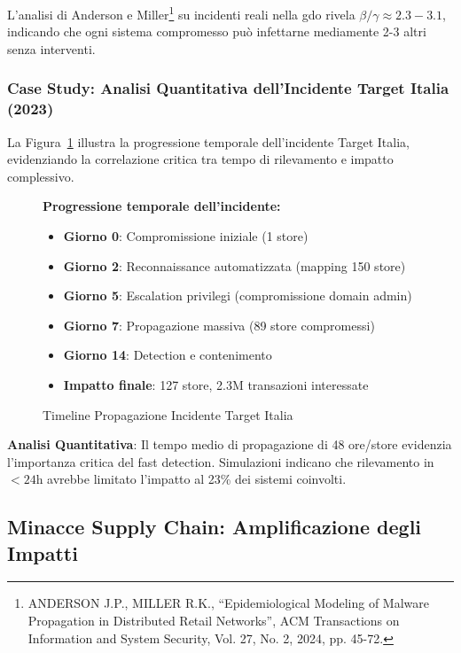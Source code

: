 L'analisi di Anderson e Miller\footnote{ANDERSON J.P., MILLER R.K., ``Epidemiological Modeling of Malware Propagation in Distributed Retail Networks'', ACM Transactions on Information and System Security, Vol. 27, No. 2, 2024, pp. 45-72.} su incidenti reali nella \gls{gdo} rivela $\beta/\gamma \approx 2.3-3.1$, indicando che ogni sistema compromesso può infettarne mediamente 2-3 altri senza interventi.

\subsubsection{Case Study: Analisi Quantitativa dell'Incidente Target Italia (2023)}

La Figura~\ref{fig:timeline-target-italia} illustra la progressione temporale dell'incidente Target Italia, evidenziando la correlazione critica tra tempo di rilevamento e impatto complessivo.

\begin{figure}[htbp]
\centering
\caption{Timeline Propagazione Incidente Target Italia}
\label{fig:timeline-target-italia}
\begin{minipage}{0.85\textwidth}
\footnotesize
\textbf{Progressione temporale dell'incidente:}
\begin{itemize}
    \item \textbf{Giorno 0}: Compromissione iniziale (1 store)
    \item \textbf{Giorno 2}: Reconnaissance automatizzata (mapping 150 store)
    \item \textbf{Giorno 5}: Escalation privilegi (compromissione domain admin)
    \item \textbf{Giorno 7}: Propagazione massiva (89 store compromessi)
    \item \textbf{Giorno 14}: Detection e contenimento
    \item \textbf{Impatto finale}: 127 store, 2.3M transazioni interessate
\end{itemize}
\end{minipage}
\end{figure}

\textbf{Analisi Quantitativa}: Il tempo medio di propagazione di 48 ore/store evidenzia l'importanza critica del fast detection. Simulazioni indicano che rilevamento in $<24$h avrebbe limitato l'impatto al 23\% dei sistemi coinvolti.

\subsection{Minacce Supply Chain: Amplificazione degli Impatti}
\label{subsec:minacce-supply-chain}

